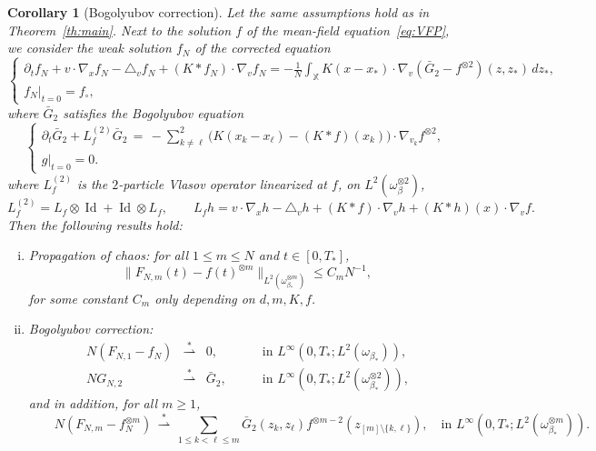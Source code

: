 \documentclass[a4paper,11pt,reqno,noindent]{amsart}
\theoremstyle{plain}
\newtheorem{cor}[theor]{Corollary}
\theoremstyle{definition}
\numberwithin{equation}{section}
\newcommand{\Xd}{\mathbb X}
\newcommand{\Id}{\operatorname{Id}}
\begin{document}
\begin{cor}[Bogolyubov correction]\label{cor:Bogo}
Let the same assumptions hold as in Theorem~\ref{th:main}.
Next to the solution $f$ of the mean-field equation~\eqref{eq:VFP}, we consider the weak solution $f_N$ of the corrected equation
\begin{equation*}
\left\{\begin{array}{l}
\partial_tf_N+v\cdot\nabla_xf_N-\triangle_vf_N+(K\ast f_N)\cdot\nabla_vf_N
=
-\tfrac1N\int_\Xd K(x-x_*)\cdot\nabla_{v}(\bar G_2-f^{\otimes2})(z,z_*)\,dz_*,\\
f_N|_{t=0}=f_\circ,
\end{array}\right.
\end{equation*}
where $\bar G_2$ satisfies the Bogolyubov equation
\begin{equation}\label{eq:Bogo}
\left\{\begin{array}{l}
\partial_t \bar G_2+L_f^{(2)}\bar G_2
\,=\,
-\sum_{k\ne\ell}^2\Big(K(x_k-x_\ell)-(K\ast f)(x_k)\Big)\cdot\nabla_{v_k}f^{\otimes2},\\
g|_{t=0}=0.
\end{array}\right.
\end{equation}
where $L_f^{(2)}$ is the $2$-particle Vlasov operator linearized at $f$, on $L^2(\omega_\beta^{\otimes2})$,
\[L_f^{(2)}=L_f\otimes\Id+\Id\otimes L_f,\qquad L_fh=v\cdot\nabla_{x}h-\triangle_{v}h+(K\ast f)\cdot\nabla_{v}h+(K\ast h)(x)\cdot\nabla_{v}f.\]
Then the following results hold:
\begin{enumerate}[(i)]
\item \emph{Propagation of chaos:} for all $1\le m\le N$ and $t\in[0,T_*]$,
\[\|F_{N,m}(t)-f(t)^{\otimes m}\|_{L^2(\omega_{\beta_*}^{\otimes m})}\le C_mN^{-1},\]
for some constant $C_m$ only depending on $d,m,K,f$.
\smallskip\item \emph{Bogolyubov correction:}
\begin{equation*}\begin{array}{rlll}
N(F_{N,1}-f_N)&\overset*\rightharpoonup& 0,\qquad&\text{in $L^\infty(0,T_*;L^2(\omega_{\beta_*}))$,}\\
NG_{N,2}&\overset*\rightharpoonup&\bar G_2,\qquad&\text{in $L^\infty(0,T_*;L^2(\omega_{\beta_*}^{\otimes2}))$,}
\end{array}\end{equation*}
and in addition, for all $m\ge1$,
\[\qquad N(F_{N,m}-f_N^{\otimes m})\,
\overset*\rightharpoonup\,\sum_{1\le k<\ell\le m}\bar G_2(z_k,z_\ell)f^{\otimes m-2}(z_{[m]\setminus\{k,\ell\}}),\quad\text{in $L^\infty(0,T_*;L^2(\omega_{\beta_*}^{\otimes m}))$.}\]
\end{enumerate}
\end{cor}
\end{document}
